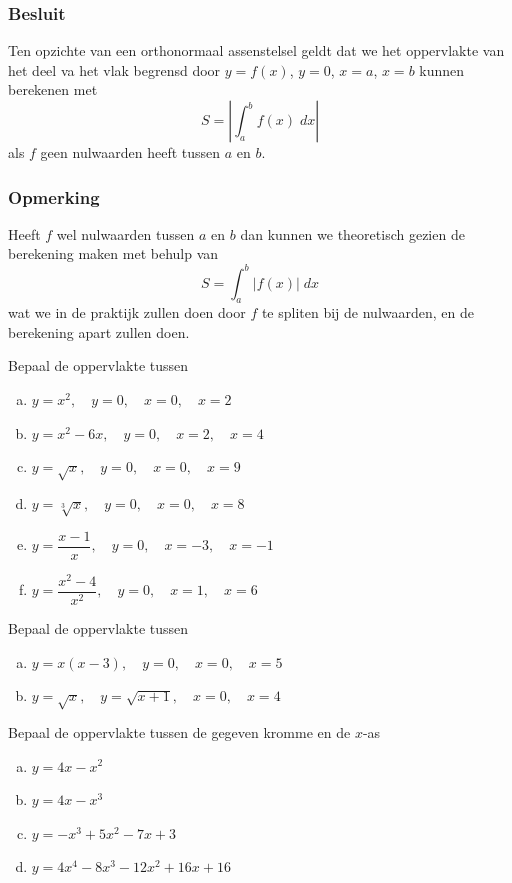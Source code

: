 \documentclass[a4paper,12pt, twoside]{article}
\begin{document}
\subsubsection*{Besluit}

Ten opzichte van een orthonormaal assenstelsel geldt dat we het oppervlakte van het deel va het vlak begrensd door $y=f(x)$, $y=0$, $x=a$, $x=b$ kunnen berekenen met
$$S = |\int_a^b f(x)\;dx|$$
als $f$ geen nulwaarden heeft tussen $a$ en $b$.

\subsubsection*{Opmerking}

Heeft $f$ wel nulwaarden tussen $a$ en $b$ dan kunnen we theoretisch gezien de berekening maken met behulp van
$$S = \int_a^b |f(x)|\;dx$$
wat we in de praktijk zullen doen door $f$ te spliten bij de nulwaarden, en de berekening apart zullen doen.

\begin{oefening}
Bepaal de oppervlakte tussen
\begin{enumerate}[(a)]
\itemsep1em
  \item $\displaystyle y=x^2,\quad y=0,\quad x=0, \quad x=2$
  \item $\displaystyle y=x^2-6x,\quad y=0,\quad x=2, \quad x=4$
  \item $\displaystyle y=\sqrt{x},\quad y=0,\quad x=0, \quad x=9$
  \item $\displaystyle y=\sqrt[3]{x},\quad y=0,\quad x=0, \quad x=8$
  \item $\displaystyle y=\dfrac{x-1}{x},\quad y=0,\quad x=-3, \quad x=-1$
  \item $\displaystyle y=\dfrac{x^2-4}{x^2},\quad y=0,\quad x=1, \quad x=6$
\end{enumerate}
\end{oefening}

\begin{oefening}
Bepaal de oppervlakte tussen
\begin{enumerate}[(a)]
\itemsep1em
  \item $\displaystyle y=x(x-3),\quad y=0,\quad x=0, \quad x=5$
  \item $\displaystyle y=\sqrt{x},\quad y=\sqrt{x+1},\quad x=0, \quad x=4$
\end{enumerate}
\end{oefening}

\begin{oefening}
Bepaal de oppervlakte tussen de gegeven kromme en de $x$-as
\begin{multicols}{2}
\begin{enumerate}[(a)]
\itemsep1em
  \item $\displaystyle y=4x-x^2$
  \item $\displaystyle y=4x-x^3$
  \item $\displaystyle y=-x^3+5x^2-7x+3$
  \item $\displaystyle y=4x^4-8x^3-12x^2+16x+16$
\end{enumerate}
\end{multicols}
\end{oefening}
\end{document}
